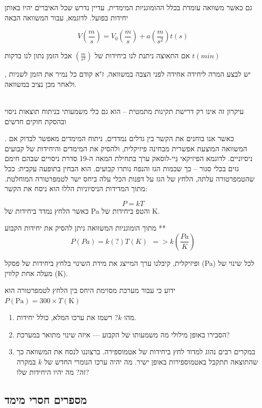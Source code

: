 \documentclass[
  hebrew,
  letterpaper,
  DIV=11,
  numbers=noendperiod]{scrreprt}
\providecommand{\tightlist}{%
  \setlength{\itemsep}{0pt}\setlength{\parskip}{0pt}}
\begin{document}
{גם כאשר משוואה עומדת בכלל ההומוגניות המימדית, עדיין נדרש שכל האיברים
יהיו באותן יחידות בפועל.} {לדוגמא, עבור המשוואה הבאה}

\[V\left( \frac{m}{s} \right) = V_{0}\left( \frac{m}{s} \right) + a\left( \frac{m}{s^{2}} \right)t(s)\]

{אם התאוצה ניתנת לנו ביחידות של} \(\left( \frac{m}{s^{2}} \right)\) {אבל
הזמן נתון לנו בדקות} \(t(min)\){, יש לבצע המרה ליחידה אחידה לפני הצבה
במשוואה, ז"א קודם כל נמיר את הזמן לשניות ולאחר מכן נציב במשוואה.\\
\strut \\
עיקרון זה אינו רק דרישת תקינות מתמטית -- הוא גם כלי משמעותי בניתוח
תוצאות ניסוי ובהסקת חוקים חדשים}. {כאשר אנו בוחנים את הקשר בין גדלים
נמדדים, ניתוח המימדים מאפשר לבדוק אם המשוואה המוצעת אפשרית מבחינה
פיזיקלית, ולהסיק את המימדים והיחידות של קבועים ניסיוניים}. {לדוגמא
הפיזיקאי גֵּיי-לוסאק ערך בתחילת המאה ה-19 סדרת ניסויים שבהם חימם גזים בכלי
סגור -- כך שכמות הגז והנפח נותרו קבועים. הוא הבחין בתופעה עקבית}: {ככל
שהטמפרטורה עלתה}, {הלחץ של הגז על דפנות הכלי עלה ביחס ישר לטמפרטורה
המוחלטת}. {מתוך המדידות הניסיוניות הללו הוא ניסח את הקשר}:

\[P = kT\] {כאשר הלחץ נמדד ביחידות של} Pa {והטפ\textquotesingle{}
ביחידות של} K{.}

{מתוך הומוגניות המשוואה ניתן להסיק את יחידות הקבוע} **
\[P(Pa) = k(?)T(K)\ \  = > k\left( \frac{Pa}{K} \right)\]

ופיזיקלית, קיבלנו ערך המייצג את מידת השינוי בלחץ ביחידות של פסקל (Pa)
לכל שינוי של מעלה אחת קלווין (K).

ידוע כי עבור מערכת מסוימת היחס בין הלחץ לטמפרטורה הוא\\
\(P(\text{Pa}) = 300 \times T(\text{K})\)

\begin{enumerate}
\def\labelenumi{\arabic{enumi}.}
\tightlist
\item
  מהו \(k\)? רשמו את ערכו המלא, כולל יחידות.\\
\item
  הסבירו באופן מילולי מה משמעותו של הקבוע --- איזה שינוי מתואר במערכת?\\
\item
  במקרים רבים נהוג למדוד לחץ ביחידות של אטמוספירה. ברצוננו לנסח את
  המשוואה כך שהתוצאה תתקבל באטמוספירות באופן ישיר. מה יהיה ערכו הנומרי
  החדש של \(k\) במקרה זה? מה יהיו היחידות שלו?\\
\end{enumerate}

\subsection{\texorpdfstring{{מספרים חסרי
מימד}}{מספרים חסרי מימד}}\label{ux5deux5e1ux5e4ux5e8ux5d9ux5dd-ux5d7ux5e1ux5e8ux5d9-ux5deux5d9ux5deux5d3}
\end{document}
